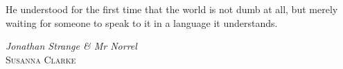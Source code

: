 \cleardoublepage
\thispagestyle{plain}
\epigraph{He understood for the first time that the world is not dumb at all, but merely waiting for someone to speak to it in a language it understands.}{\emph{Jonathan Strange \& Mr Norrel} \\ \textsc{Susanna Clarke}}